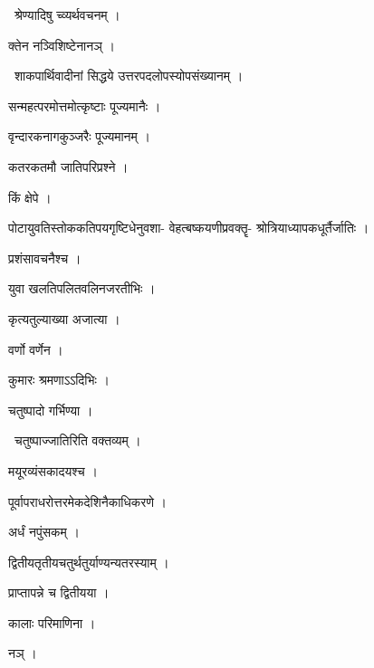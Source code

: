 \documentclass[10pt, openany, oneside]{book}
\begin{document}
\par\noindent\hspace{1.5em}{\vps वा॰}~{\qt श्रेण्यादिषु च्व्यर्थवचनम् ।}

\noindent क्तेन नञ्विशिष्टेनानञ् ।

\par\noindent\hspace{1.5em}{\vps वा॰}~{\qt शाकपार्थिवादीनां सिद्धये उत्तरपदलोपस्योपसंख्यानम् ।}

\noindent सन्महत्परमोत्तमोत्कृष्टाः पूज्यमानैः ।

\noindent वृन्दारकनागकुञ्जरैः पूज्यमानम् ।

\noindent कतरकतमौ जातिपरिप्रश्ने ।

\noindent किं क्षेपे ।

\noindent पोटायुवतिस्तोककतिपयगृष्टिधेनुवशा- वेहत्बष्कयणीप्रवक्तॄ- श्रोत्रियाध्यापकधूर्तैर्जातिः ।

\noindent प्रशंसावचनैश्च ।

\noindent युवा खलतिपलितवलिनजरतीभिः ।

\noindent कृत्यतुल्याख्या अजात्या ।

\noindent वर्णो वर्णेन ।

\noindent कुमारः श्रमणाऽऽदिभिः ।

\noindent चतुष्पादो गर्भिण्या ।

\par\noindent\hspace{1.5em}{\vps वा॰}~{\qt चतुष्पाज्जातिरिति वक्तव्यम् ।}

\noindent मयूरव्यंसकादयश्च ।

\noindent पूर्वापराधरोत्तरमेकदेशिनैकाधिकरणे ।

\noindent अर्धं नपुंसकम् ।

\noindent द्वितीयतृतीयचतुर्थतुर्याण्यन्यतरस्याम् ।

\noindent प्राप्तापन्ने च द्वितीयया ।

\noindent कालाः परिमाणिना ।

\noindent नञ् ।
\end{document}
